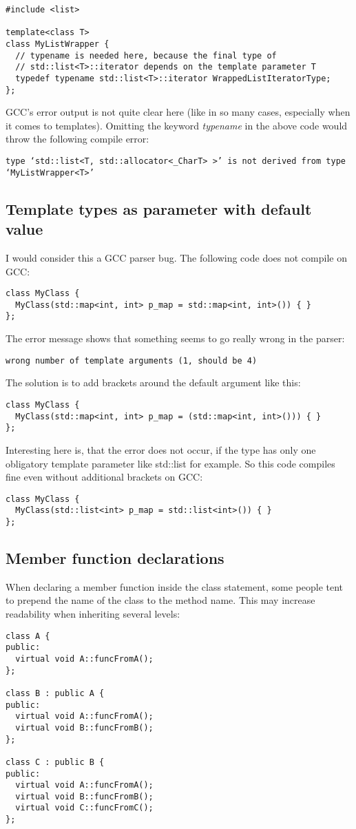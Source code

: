 \begin{verbatim}
#include <list>

template<class T>
class MyListWrapper {
  // typename is needed here, because the final type of 
  // std::list<T>::iterator depends on the template parameter T
  typedef typename std::list<T>::iterator WrappedListIteratorType;
};
\end{verbatim}
GCC's error output is not quite clear here (like in so many cases, especially when it comes to templates). Omitting the keyword \emph{typename} in the above code would throw the following compile error:
\begin{verbatim}
type ‘std::list<T, std::allocator<_CharT> >’ is not derived from type ‘MyListWrapper<T>’
\end{verbatim}

\subsection{Template types as parameter with default value} I would consider this a GCC parser bug. The following code does not compile on GCC:
\begin{verbatim}
class MyClass {
  MyClass(std::map<int, int> p_map = std::map<int, int>()) { }
};
\end{verbatim}
The error message shows that something seems to go really wrong in the parser:
\begin{verbatim}
wrong number of template arguments (1, should be 4)
\end{verbatim}
The solution is to add brackets around the default argument like this:
\begin{verbatim}
class MyClass {
  MyClass(std::map<int, int> p_map = (std::map<int, int>())) { }
};
\end{verbatim}
Interesting here is, that the error does not occur, if the type has only one obligatory template parameter like std::list for example. So this code compiles fine even without additional brackets on GCC:
\begin{verbatim}
class MyClass {
  MyClass(std::list<int> p_map = std::list<int>()) { }
};
\end{verbatim}

\subsection{Member function declarations} When declaring a member function inside the class statement, some people tent to prepend the name of the class to the method name. This may increase readability when inheriting several levels:
\begin{verbatim}
class A {
public:
  virtual void A::funcFromA();
};

class B : public A {
public:
  virtual void A::funcFromA();
  virtual void B::funcFromB();
};

class C : public B {
public:
  virtual void A::funcFromA();
  virtual void B::funcFromB();
  virtual void C::funcFromC();
};
\end{verbatim}

